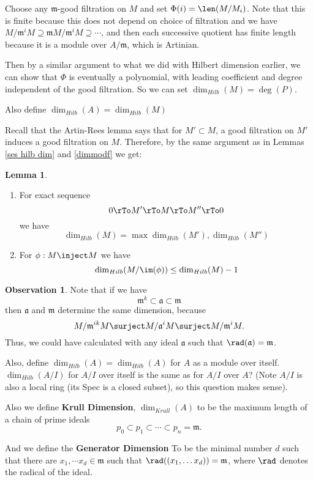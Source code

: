 \documentclass[12 pt]{article}
\theoremstyle{definition}
\newtheorem{lemma}[thm]{Lemma}
\newtheorem{obs}[thm]{Observation}
\renewcommand{\(}{\left(}
\renewcommand{\)}{\right)}
\newcommand\fa{{\mathfrak a}}
\newcommand\fm{{\mathfrak m}}
\begin{document}
Choose any $\fm$-good filtration on $M$ and set $\Phi(i)=\len(M/M_i)$. Note that this is finite because this does not depend on choice of filtration and we have $M/\fm^iM \supseteq \fm M/\fm^iM \supseteq \cdots$, and then each successive quotient has finite length because it is a module over $A/\fm$, which is Artinian.

Then by a similar argument to what we did with Hilbert dimension earlier, we can show that $\Phi$ is eventually a polynomial, with leading coefficient and degree independent of the good filtration. So we can set $\dim_{Hilb}(M)=\deg(P)$.

Also define $\dim_{Hilb}(A)=\dim_{Hilb}(M)$


Recall that the Artin-Rees lemma says that for $M' \subset M$, a good filtration on $M'$ induces a good filtration on $M$. Therefore, by the same argument as in Lemmas \ref{ses hilb dim} and \ref{dimmodf} we get:
\begin{lemma}
\begin{enumerate}
\item For exact sequence
\[0 \rTo M' \rTo M \rTo M'' \rTo 0\]
we have
\[\dim_{Hilb}(M)=\max{\dim_{Hilb}(M'), \dim_{Hilb}(M'')}\]

\item For $\phi:M \inject M$ we have
\[\dim_{Hilb}(M/\im(\phi)) \leq \dim_{Hilb}(M)-1\]
\end{enumerate}
\label{local dim drop}
\end{lemma}


\begin{obs} Note that if we have
\[\fm^k \subset \fa \subset \fm\]
then $\fa$ and $\fm$ determine the same dimension, because
\[M/\fm^{ik}M \surject M/\fa^i M \surject M/\fm^i M.\]
Thus, we could have calculated with any ideal $\fa$ such that $\rad(\fa)=\fm$.
\end{obs}

Also, define $\dim_{Hilb}(A)=\dim_{Hilb}(A)$ for $A$ as a module over itself. $\dim_{Hilb}(A/I)$ for $A/I$ over itself is the same as for $A/I$ over $A$? (Note $A/I$ is also a local ring (its Spec is a closed subset), so this question makes sense).

Also we define \textbf{Krull Dimension}, $\dim_{Krull}(A)$ to be the maximum length of a chain of prime ideals
\[p_0 \subset p_1 \subset \cdots \subset p_n=\fm.\]

And we define the \textbf{Generator Dimension} To be the minimal number $d$ such that there are $x_1, \cdots x_d \in \fm$ such that $\rad((x_1, \ldots x_d))=\fm$, where $\rad$ denotes the radical of the ideal.
\end{document}
